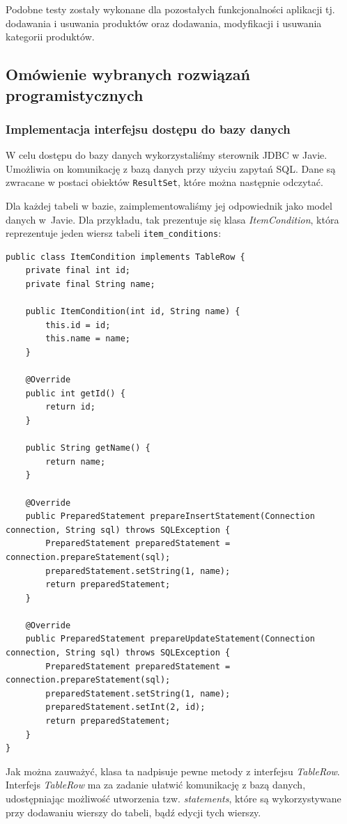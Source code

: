 Podobne testy zostały wykonane dla pozostałych funkcjonalności aplikacji tj. dodawania i usuwania produktów oraz dodawania, modyfikacji i usuwania kategorii produktów.

\subsection{Omówienie wybranych rozwiązań programistycznych}
\subsubsection{Implementacja interfejsu dostępu do bazy danych}

W celu dostępu do bazy danych wykorzystaliśmy sterownik JDBC w Javie. Umożliwia on komunikację z bazą danych przy użyciu zapytań SQL. Dane są zwracane w postaci obiektów \lstinline|ResultSet|, które można następnie odczytać.

Dla każdej tabeli w bazie, zaimplementowaliśmy jej odpowiednik jako model danych w~Javie. Dla przykładu, tak prezentuje się klasa \emph{ItemCondition}, która reprezentuje jeden wiersz tabeli \lstinline|item_conditions|:

\begin{lstlisting}[style=Java]
public class ItemCondition implements TableRow {
	private final int id;
	private final String name;

	public ItemCondition(int id, String name) {
		this.id = id;
		this.name = name;
	}

	@Override
	public int getId() {
		return id;
	}

	public String getName() {
		return name;
	}

	@Override
	public PreparedStatement prepareInsertStatement(Connection connection, String sql) throws SQLException {
		PreparedStatement preparedStatement = connection.prepareStatement(sql);
		preparedStatement.setString(1, name);
		return preparedStatement;
	}

	@Override
	public PreparedStatement prepareUpdateStatement(Connection connection, String sql) throws SQLException {
		PreparedStatement preparedStatement = connection.prepareStatement(sql);
		preparedStatement.setString(1, name);
		preparedStatement.setInt(2, id);
		return preparedStatement;
	}
}
\end{lstlisting}

Jak można zauważyć, klasa ta nadpisuje pewne metody z interfejsu \emph{TableRow}. Interfejs \emph{TableRow} ma za zadanie ułatwić komunikację z bazą danych, udostępniając możliwość utworzenia tzw. \emph{statements}, które są wykorzystywane przy dodawaniu wierszy do tabeli, bądź edycji tych wierszy.

